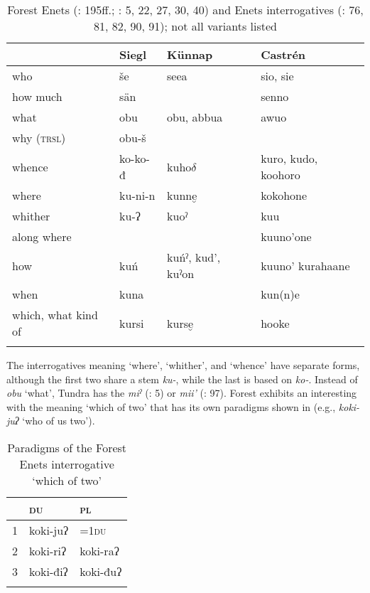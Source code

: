 \begin{table}
\caption{Forest Enets (\citealt{Siegl2013}: 195ff.; \citealt{Künnap1999b}: 5, 22, 27, 30, 40) and Enets interrogatives (\citealt{Castrén1855}: 76, 81, 82, 90, 91); not all variants listed}
\label{tab:ural:5}

\begin{tabularx}{\textwidth}{lQQQ}
\lsptoprule
& \textbf{Siegl} & \textbf{Künnap} & \textbf{Castrén}\\
\midrule
who & še & seea & sio, sie\\
how much & sän &  & senno\\
what & obu & obu, abbua & awuo\\
why (\textsc{trsl}) & obu-š &  & \\
whence & ko-ko-đ & kuho$\delta $ & kuro, kudo, koohoro\\
where & ku-ni-n & kunn{e̮} & kokohone\\
whither & ku-ʔ & kuoˀ & kuu\\
along where &  &  & kuuno’one\\
how & kuń & kuńˀ, kud’, kuˀon & kuuno’ kurahaane\\
when & kuna &  & kun(n)e\\
which, what kind of & kursi & kurs{e̮} & hooke\\
\lspbottomrule
\end{tabularx}
\end{table}

\largerpage
The interrogatives meaning ‘where’, ‘whither’, and ‘whence’ have separate forms, although the first two share a stem \textit{ku-}, while the last is based on \textit{ko-}. Instead of \textit{obu} ‘what’, Tundra  has the  \textit{miˀ} (\citealt{Künnap1999b}: 5) or \textit{mii’} (\citealt{Castrén1855}: 97). Forest  exhibits an interesting  with the meaning ‘which of two’ that has its own paradigms shown in  (e.g., \textit{koki-juʔ} ‘who of us two’).

\begin{table}
\caption{Paradigms of the Forest Enets interrogative ‘which of two’ \citep[198]{Siegl2013}}
\label{tab:ural:6}

\begin{tabularx}{\textwidth}{XXl}
\lsptoprule
& \textbf{\textsc{du}} & \textbf{\textsc{pl}}\\
\midrule
\textsc{1} & koki-juʔ & =1\textsc{du}\\
\textsc{2} & koki-riʔ & koki-raʔ\\
\textsc{3} & koki-điʔ & koki-đuʔ\\
\lspbottomrule
\end{tabularx}
\end{table}

